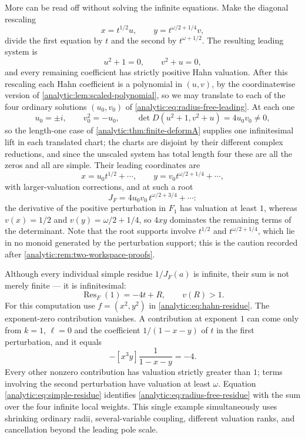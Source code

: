 \documentclass[11pt,letterpaper]{article}
\theoremstyle{definition}
\theoremstyle{remark}
\newcommand{\Res}{\operatorname{Res}}
\numberwithin{equation}{section}
\begin{document}
More can be read off without solving the infinite equations. Make the
diagonal rescaling
\begin{equation}\label{analytic:eq:radius-free-scaling}
 x=t^{1/2}u,\qquad y=t^{\omega/2+1/4}v ,
\end{equation}
divide the first equation by $t$ and the second by $t^{\omega+1/2}$. The
resulting leading system is
\begin{equation}\label{analytic:eq:radius-free-leading}
 u^2+1=0,\qquad v^2+u=0 ,
\end{equation}
and every remaining coefficient has strictly positive Hahn valuation. After
this rescaling each Hahn coefficient is a polynomial in $(u,v)$, by the
coordinatewise version of
\cref{analytic:lem:scaled-polynomial}, so we may translate to each of the
four ordinary solutions $(u_0,v_0)$ of
\eqref{analytic:eq:radius-free-leading}. At each one
\[
 u_0=\pm i,\qquad v_0^2=-u_0,\qquad
 \det D(u^2+1,v^2+u)=4u_0v_0\ne0 ,
\]
so the length-one case of \cref{analytic:thm:finite-deformA} supplies one
infinitesimal lift in each translated chart; the charts are disjoint by
their different complex reductions, and since the unscaled system has total
length four these are all the zeros and all are simple. Their leading
coordinates are
\begin{equation}\label{analytic:eq:radius-free-roots}
 x=u_0t^{1/2}+\cdots,\qquad y=v_0t^{\omega/2+1/4}+\cdots ,
\end{equation}
with larger-valuation corrections, and at such a root
\begin{equation}\label{analytic:eq:radius-free-J}
 J_F=4u_0v_0\,t^{\omega/2+3/4}+\cdots :
\end{equation}
the derivative of the positive perturbation in $F_1$ has valuation at least
$1$, whereas $v(x)=1/2$ and $v(y)=\omega/2+1/4$, so $4xy$ dominates the
remaining terms of the determinant. Note that the root supports involve
$t^{1/2}$ and $t^{\omega/2+1/4}$, which lie in no monoid generated by the
perturbation support; this is the caution recorded after
\cref{analytic:rem:two-workspace-proofs}.

Although every individual simple residue $1/J_F(a)$ is infinite, their sum
is not merely finite --- it is infinitesimal:
\begin{equation}\label{analytic:eq:radius-free-residue}
 \boxed{\qquad\Res_F(1)=-4t+R,\qquad v(R)>1.\qquad}
\end{equation}
For this computation use $f=(x^2,y^2)$ in
\eqref{analytic:eq:hahn-residue}. The exponent-zero contribution vanishes.
A contribution at exponent $1$ can come only from $k=1$, $\ell=0$ and the
coefficient $1/(1-x-y)$ of $t$ in the first perturbation, and it equals
\[
 -[x^3y]\frac1{1-x-y}=-4 .
\]
Every other nonzero contribution has valuation strictly greater than $1$;
terms involving the second perturbation have valuation at least $\omega$.
Equation \eqref{analytic:eq:simple-residue} identifies
\eqref{analytic:eq:radius-free-residue} with the sum over the four infinite
local weights. This single example simultaneously uses shrinking ordinary
radii, several-variable coupling, different valuation ranks, and
cancellation beyond the leading pole scale.
\end{document}
